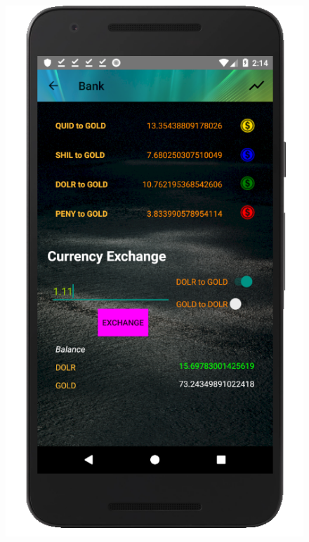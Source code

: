 \documentclass[12pt]{article}
\begin{document}
\begin{figure}
	\includegraphics[scale=0.25]{BankActivityInputAmount.png}

\end{figure}
\end{document}
